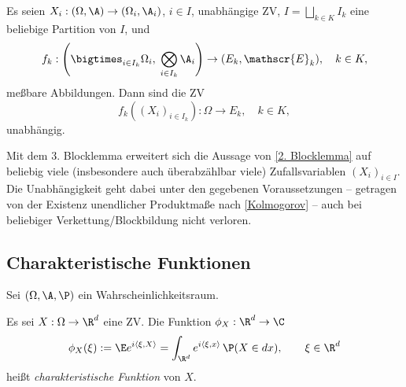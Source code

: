 \documentclass[11pt, a4paper]{article}
\begin{document}
\begin{corollary}[3. Blocklemma] \Theorem
    Es seien $X_i: (\Omega, \A) \to (\Omega_i, \A_i)$, $i \in I$, unabhängige ZV, $I = \bigsqcup_{k \in K} I_k$ eine beliebige Partition von $I$, und
    $$f_k: \left( \bigtimes_{i\in I_k} \Omega_i, \; \bigotimes_{i\in I_k} \A_i \right) \to (E_k, \mathscr{E}_k), \quad k \in K,$$
    meßbare Abbildungen. Dann sind die ZV
    $$f_k\left((X_i)_{i\in I_k}\right): \Omega \to E_k, \quad k \in K,$$
    unabhängig.
\end{corollary}

\begin{note}
    Mit dem 3. Blocklemma erweitert sich die Aussage von \ref{2. Blocklemma} auf beliebig viele (insbesondere auch überabzählbar viele) Zufallsvariablen $(X_i)_{i \in I}$. Die Unabhängigkeit geht dabei unter den gegebenen Voraussetzungen -- getragen von der Existenz unendlicher Produktmaße nach \ref{Kolmogorov} -- auch bei beliebiger Verkettung/Blockbildung nicht verloren.
\end{note}


\subsection{Charakteristische Funktionen}

Sei $(\Omega,\A, \P)$ ein Wahrscheinlichkeitsraum. 
\begin{definition} \Theorem
    Es sei $X: \Omega \to \R^d$ eine ZV. Die Funktion $\phi_X: \R^d \to \C$
    $$\phi_X(\xi) := \E e^{i\langle \xi, X\rangle} = \int_{\R^d} e^{i\langle \xi, x\rangle} \, \P(X \in dx), \qquad \xi \in \R^d$$
    heißt \emph{charakteristische Funktion} von $X$.
\end{definition}
\end{document}
